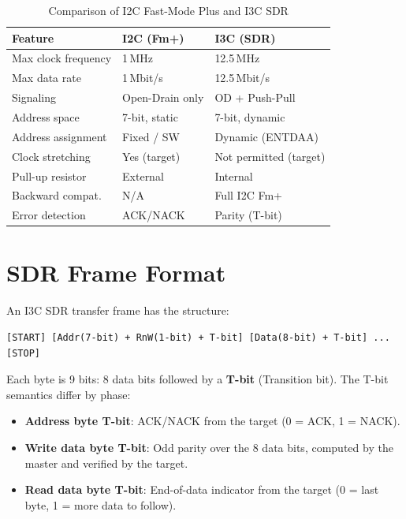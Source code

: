 \documentclass[12pt, a4paper, oneside]{report}
\begin{document}
\begin{table}[H]
\centering
\caption{Comparison of I2C Fast-Mode Plus and I3C SDR}
\label{tab:i3c_vs_i2c}
\begin{tabularx}{\textwidth}{L{5cm} L{4.5cm} L{4.5cm}}
\toprule
\textbf{Feature} & \textbf{I2C (Fm+)} & \textbf{I3C (SDR)} \\
\midrule
Max clock frequency  & 1\,MHz         & 12.5\,MHz \\
Max data rate        & 1\,Mbit/s      & 12.5\,Mbit/s \\
Signaling            & Open-Drain only & OD + Push-Pull \\
Address space        & 7-bit, static  & 7-bit, dynamic \\
Address assignment   & Fixed / SW     & Dynamic (ENTDAA) \\
Clock stretching     & Yes (target)   & Not permitted (target) \\
Pull-up resistor     & External       & Internal \\
Backward compat.     & N/A            & Full I2C Fm+ \\
Error detection      & ACK/NACK       & Parity (T-bit) \\
\bottomrule
\end{tabularx}
\end{table}

\section{SDR Frame Format}

An I3C SDR transfer frame has the structure:

\begin{lstlisting}[style=plain, caption={I3C SDR frame format}]
[START] [Addr(7-bit) + RnW(1-bit) + T-bit] [Data(8-bit) + T-bit] ... [STOP]
\end{lstlisting}

Each byte is 9 bits: 8 data bits followed by a \textbf{T-bit} (Transition bit). The
T-bit semantics differ by phase:

\begin{itemize}
  \item \textbf{Address byte T-bit}: ACK/NACK from the target (0 = ACK, 1 = NACK).
  \item \textbf{Write data byte T-bit}: Odd parity over the 8 data bits, computed by
        the master and verified by the target.
  \item \textbf{Read data byte T-bit}: End-of-data indicator from the target (0 = last
        byte, 1 = more data to follow).
\end{itemize}
\end{document}
